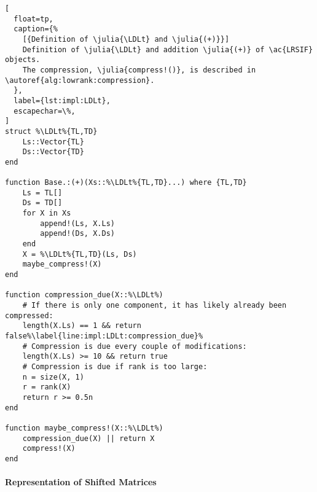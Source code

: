 \begin{lstlisting}[
  float=tp,
  caption={%
    [{Definition of \julia{\LDLt} and \julia{(+)}}]
    Definition of \julia{\LDLt} and addition \julia{(+)} of \ac{LRSIF} objects.
    The compression, \julia{compress!()}, is described in \autoref{alg:lowrank:compression}.
  },
  label={lst:impl:LDLt},
  escapechar=\%,
]
struct %\LDLt%{TL,TD}
    Ls::Vector{TL}
    Ds::Vector{TD}
end

function Base.:(+)(Xs::%\LDLt%{TL,TD}...) where {TL,TD}
    Ls = TL[]
    Ds = TD[]
    for X in Xs
        append!(Ls, X.Ls)
        append!(Ds, X.Ds)
    end
    X = %\LDLt%{TL,TD}(Ls, Ds)
    maybe_compress!(X)
end

function compression_due(X::%\LDLt%)
    # If there is only one component, it has likely already been compressed:
    length(X.Ls) == 1 && return false%\label{line:impl:LDLt:compression_due}%
    # Compression is due every couple of modifications:
    length(X.Ls) >= 10 && return true
    # Compression is due if rank is too large:
    n = size(X, 1)
    r = rank(X)
    return r >= 0.5n
end

function maybe_compress!(X::%\LDLt%)
    compression_due(X) || return X
    compress!(X)
end
\end{lstlisting}

\paragraph{Representation of Shifted Matrices}

